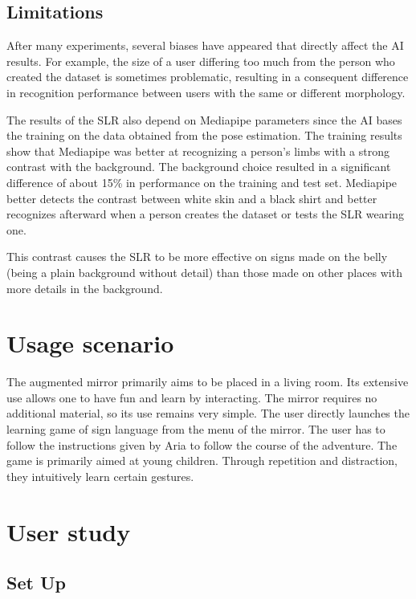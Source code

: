 \subsection{Limitations}

After many experiments, several biases have appeared that directly affect the AI results. For example, the size of a user differing too much from the person who created the dataset is sometimes problematic, resulting in a consequent difference in recognition performance between users with the same or different morphology. 

The results of the SLR also depend on Mediapipe parameters since the AI bases the training on the data obtained from the pose estimation. The training results show that Mediapipe was better at recognizing a person's limbs with a strong contrast with the background. The background choice resulted in a significant difference of about 15\% in performance on the training and test set. Mediapipe better detects the contrast between white skin and a black shirt and better recognizes afterward when a person creates the dataset or tests the SLR wearing one. 

This contrast causes the SLR to be more effective on signs made on the belly (being a plain background without detail) than those made on other places with more details in the background.

\section{Usage scenario}

The augmented mirror primarily aims to be placed in a living room. Its extensive use allows one to have fun and learn by interacting.
The mirror requires no additional material, so its use remains very simple.
The user directly launches the learning game of sign language from the menu of the mirror. The user has to follow the instructions given by Aria to follow the course of the adventure. The game is primarily aimed at young children. Through repetition and distraction, they intuitively learn certain gestures.

\section{User study}

\subsection{Set Up}

